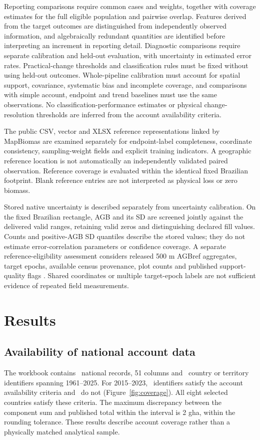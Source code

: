 \documentclass[11pt,a4paper]{article}
\begin{document}
Reporting comparisons require common cases and weights, together with coverage estimates for the full eligible population and pairwise overlap. Features derived from the target outcomes are distinguished from independently observed information, and algebraically redundant quantities are identified before interpreting an increment in reporting detail. Diagnostic comparisons require separate calibration and held-out evaluation, with uncertainty in estimated error rates. Practical-change thresholds and classification rules must be fixed without using held-out outcomes. Whole-pipeline calibration must account for spatial support, covariance, systematic bias and incomplete coverage, and comparisons with simple account, endpoint and trend baselines must use the same observations. No classification-performance estimates or physical change-resolution thresholds are inferred from the account availability criteria.

The public CSV, vector and XLSX reference representations linked by MapBiomas are examined separately for endpoint-label completeness, coordinate consistency, sampling-weight fields and explicit training indicators. A geographic reference location is not automatically an independently validated paired observation. Reference coverage is evaluated within the identical fixed Brazilian footprint. Blank reference entries are not interpreted as physical loss or zero biomass.


Stored native uncertainty is described separately from uncertainty calibration. On the fixed Brazilian rectangle, AGB and its SD are screened jointly against the delivered valid ranges, retaining valid zeros and distinguishing declared fill values. Counts and positive-AGB SD quantiles describe the stored values; they do not estimate error-correlation parameters or confidence coverage. A separate reference-eligibility assessment considers released 500 m AGBref aggregates, target epochs, available census provenance, plot counts and published support-quality flags \citep{AGBref2026,AGBrefData2026}. Shared coordinates or multiple target-epoch labels are not sufficient evidence of repeated field measurements.

\section{Results}
\subsection{Availability of national account data}
The workbook contains \NationalRows\ national records, 51 columns and \CountryIDs\ country or territory identifiers spanning 1961--2025. For 2015--2023, \AccountPass\ identifiers satisfy the account availability criteria and \AccountFail\ do not (Figure~\ref{fig:coverage}). All eight selected countries satisfy these criteria. The maximum discrepancy between the component sum and published total within the interval is 2 gha, within the rounding tolerance. These results describe account coverage rather than a physically matched analytical sample.
\end{document}

